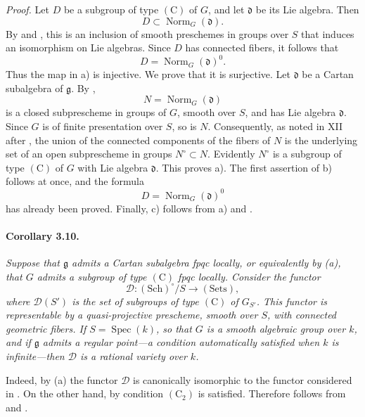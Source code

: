 \emph{Proof.}
Let \(D\) be a subgroup of type \((\mathrm C)\) of \(G\), and let
\(\mathfrak d\) be its Lie algebra. Then
\[
  D\subset\operatorname{Norm}_G(\mathfrak d).
\]
By  and , this is an inclusion of smooth
preschemes in groups over \(S\) that induces an isomorphism on Lie
algebras. Since \(D\) has connected fibers, it follows that
\[
  D=\operatorname{Norm}_G(\mathfrak d)^0.
\]
Thus the map in \textup{a)} is injective. We prove that it is
surjective. Let \(\mathfrak d\) be a Cartan subalgebra of
\(\mathfrak g\). By ,
\[
  N=\operatorname{Norm}_G(\mathfrak d)
\]
is a closed subprescheme in groups of \(G\), smooth over \(S\), and
has Lie algebra \(\mathfrak d\). Since \(G\) is of finite
presentation over \(S\), so is \(N\). Consequently, as noted in
XII after , the union of the connected components of the fibers
of \(N\) is the underlying set of an open subprescheme in groups
\(N^\circ\subset N\). Evidently \(N^\circ\) is a subgroup of type
\((\mathrm C)\) of \(G\) with Lie algebra \(\mathfrak d\). This
proves \textup{a)}. The first assertion of \textup{b)} follows at
once, and the formula
\[
  D=\operatorname{Norm}_G(\mathfrak d)^0
\]
has already been proved. Finally, \textup{c)} follows from
\textup{a)} and .

\paragraph{\textbf{Corollary 3.10.}}
{\itshape Suppose that \(\mathfrak g\) admits a Cartan subalgebra
fpqc locally, or equivalently by \textup{(a)}, that \(G\) admits
a subgroup of type \((\mathrm C)\) fpqc locally. Consider the
functor
\[
  \mathcal D\colon(\mathrm{Sch})^\circ/S\longrightarrow
  (\mathrm{Sets}),
\]
where \(\mathcal D(S')\) is the set of subgroups of type
\((\mathrm C)\) of \(G_{S'}\). This functor is representable by a
quasi-projective prescheme, smooth over \(S\), with connected
geometric fibers. If \(S=\operatorname{Spec}(k)\), so that \(G\)
is a smooth algebraic group over \(k\), and if \(\mathfrak g\)
admits a regular point---a condition automatically satisfied when
\(k\) is infinite---then \(\mathcal D\) is a rational variety over
\(k\).}

Indeed, by \textup{(a)} the functor \(\mathcal D\) is
canonically isomorphic to the functor considered in . On the
other hand, by  condition \((\mathrm C_2)\) is satisfied.
Therefore  follows from  and .

